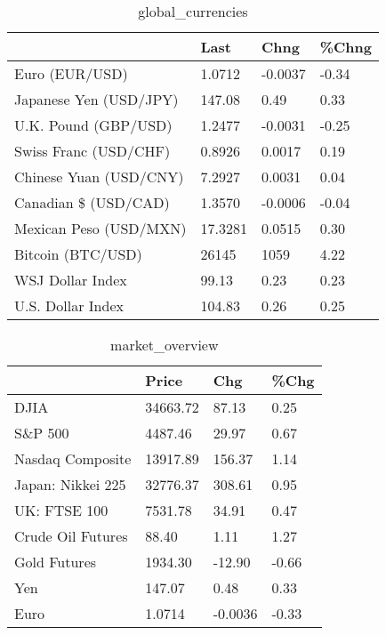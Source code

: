 \documentclass{article}%
\begin{document}
%


\begin{table}[htbp]%
\caption{global\_currencies}%
\centering%
\begin{adjustbox}{width=1\textwidth}%
\begin{tabular}{llll}
\toprule
                       &    Last &    Chng & \%Chng \\
\midrule
        Euro (EUR/USD) &  1.0712 & -0.0037 & -0.34 \\
Japanese Yen (USD/JPY) &  147.08 &    0.49 &  0.33 \\
  U.K. Pound (GBP/USD) &  1.2477 & -0.0031 & -0.25 \\
 Swiss Franc (USD/CHF) &  0.8926 &  0.0017 &  0.19 \\
Chinese Yuan (USD/CNY) &  7.2927 &  0.0031 &  0.04 \\
  Canadian \$ (USD/CAD) &  1.3570 & -0.0006 & -0.04 \\
Mexican Peso (USD/MXN) & 17.3281 &  0.0515 &  0.30 \\
     Bitcoin (BTC/USD) &   26145 &    1059 &  4.22 \\
      WSJ Dollar Index &   99.13 &    0.23 &  0.23 \\
     U.S. Dollar Index &  104.83 &    0.26 &  0.25 \\
\bottomrule
\end{tabular}
%
\end{adjustbox}%
\end{table}

%


\begin{table}[htbp]%
\caption{market\_overview}%
\centering%
\begin{adjustbox}{width=1\textwidth}%
\begin{tabular}{llll}
\toprule
                  &    Price &     Chg &  \%Chg \\
\midrule
             DJIA & 34663.72 &   87.13 &  0.25 \\
          S\&P 500 &  4487.46 &   29.97 &  0.67 \\
 Nasdaq Composite & 13917.89 &  156.37 &  1.14 \\
Japan: Nikkei 225 & 32776.37 &  308.61 &  0.95 \\
     UK: FTSE 100 &  7531.78 &   34.91 &  0.47 \\
Crude Oil Futures &    88.40 &    1.11 &  1.27 \\
     Gold Futures &  1934.30 &  -12.90 & -0.66 \\
              Yen &   147.07 &    0.48 &  0.33 \\
             Euro &   1.0714 & -0.0036 & -0.33 \\
\bottomrule
\end{tabular}
%
\end{adjustbox}%
\end{table}

%
\end{document}
